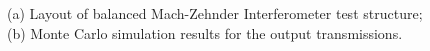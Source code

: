 \documentclass[journal]{spie}
\begin{document}
\begin{figure}[t]
    \centering
{} 
    \caption{(a) Layout of balanced Mach-Zehnder Interferometer test structure; (b) Monte Carlo simulation results for the output transmissions.} 
    \label{spatial}
\end{figure}
\end{document}
